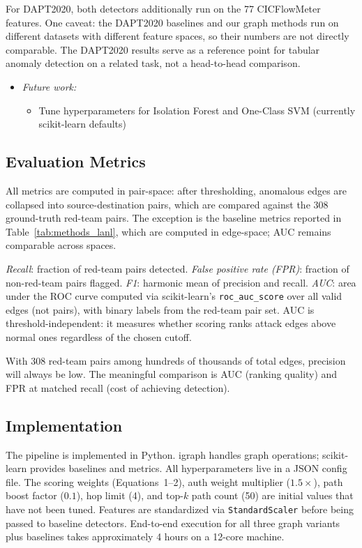 \documentclass[letterpaper,twocolumn,10pt]{article}
\begin{document}
For DAPT2020, both detectors additionally run on the 77 CICFlowMeter features. One caveat: the DAPT2020 baselines and our graph methods run on different datasets with different feature spaces, so their numbers are not directly comparable. The DAPT2020 results serve as a reference point for tabular anomaly detection on a related task, not a head-to-head comparison.

\begin{itemize}
\item \textit{Future work:}
\begin{itemize}
\item Tune hyperparameters for Isolation Forest and One-Class SVM (currently scikit-learn defaults)
\end{itemize}
\end{itemize}

\subsection{Evaluation Metrics}

All metrics are computed in pair-space: after thresholding, anomalous edges are collapsed into source-destination pairs, which are compared against the 308 ground-truth red-team pairs. The exception is the baseline metrics reported in Table~\ref{tab:methods_lanl}, which are computed in edge-space; AUC remains comparable across spaces.

\emph{Recall}: fraction of red-team pairs detected. \emph{False positive rate (FPR)}: fraction of non-red-team pairs flagged. \emph{F1}: harmonic mean of precision and recall. \emph{AUC}: area under the ROC curve computed via scikit-learn's \texttt{roc\_auc\_score} over all valid edges (not pairs), with binary labels from the red-team pair set. AUC is threshold-independent: it measures whether scoring ranks attack edges above normal ones regardless of the chosen cutoff.

With 308 red-team pairs among hundreds of thousands of total edges, precision will always be low. The meaningful comparison is AUC (ranking quality) and FPR at matched recall (cost of achieving detection).

\subsection{Implementation}

The pipeline is implemented in Python. igraph handles graph operations; scikit-learn provides baselines and metrics. All hyperparameters live in a JSON config file. The scoring weights (Equations~1--2), auth weight multiplier ($1.5\times$), path boost factor ($0.1$), hop limit (4), and top-$k$ path count (50) are initial values that have not been tuned. Features are standardized via \texttt{StandardScaler} before being passed to baseline detectors. End-to-end execution for all three graph variants plus baselines takes approximately 4 hours on a 12-core machine.
\end{document}
